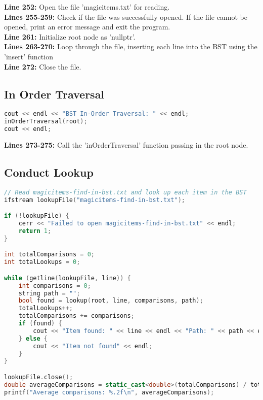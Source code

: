 \documentclass[letterpaper, 10pt,DIV=13]{scrartcl}
\numberwithin{equation}{section} %
\numberwithin{figure}{section} %
\numberwithin{table}{section} %
\begin{document}
\textbf{Line 252:} Open the file 'magicitems.txt' for reading. \\
\textbf{Lines 255-259:} Check if the file was successfully opened. If the file cannot be opened, print an error message and exit the program. \\
\textbf{Line 261:} Initialize root node as 'nullptr'. \\
\textbf{Lines 263-270:} Loop through the file, inserting each line into the BST using the 'insert' function \\
\textbf{Line 272:} Close the file.


\subsection{In Order Traversal}
\begin{linenumbers}
\begin{lstlisting}[language=C++, caption={Merge Sort and Load Hash Table}, label={code:example}]
cout << endl << "BST In-Order Traversal: " << endl;
inOrderTraversal(root);
cout << endl;
\end{lstlisting}
\end{linenumbers}
\nolinenumbers

\textbf{Lines 273-275:} Call the 'inOrderTraversal' function passing in the root node.

\subsection{Conduct Lookup}
\begin{linenumbers}
\begin{lstlisting}[language=C++, caption={Conduct Searching}, label={code:example}]
// Read magicitems-find-in-bst.txt and look up each item in the BST
ifstream lookupFile("magicitems-find-in-bst.txt");

if (!lookupFile) {
    cerr << "Failed to open magicitems-find-in-bst.txt" << endl;
    return 1;
}

int totalComparisons = 0;
int totalLookups = 0;

while (getline(lookupFile, line)) {
    int comparisons = 0;
    string path = "";
    bool found = lookup(root, line, comparisons, path);
    totalLookups++;
    totalComparisons += comparisons;
    if (found) {
        cout << "Item found: " << line << endl << "Path: " << path << endl << "Comparisons: " << comparisons << endl << endl;
    } else {
        cout << "Item not found" << endl;
    }
}

lookupFile.close();
double averageComparisons = static_cast<double>(totalComparisons) / totalLookups;
printf("Average comparisons: %.2f\n", averageComparisons);
\end{lstlisting}
\end{linenumbers}
\nolinenumbers
\end{document}
